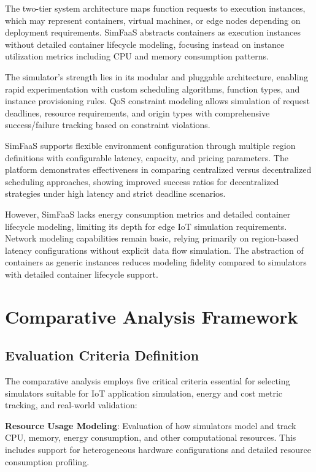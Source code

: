 The two-tier system architecture maps function requests to execution instances, which may represent containers, virtual machines, or edge nodes depending on deployment requirements. SimFaaS abstracts containers as execution instances without detailed container lifecycle modeling, focusing instead on instance utilization metrics including CPU and memory consumption patterns.

The simulator's strength lies in its modular and pluggable architecture, enabling rapid experimentation with custom scheduling algorithms, function types, and instance provisioning rules. QoS constraint modeling allows simulation of request deadlines, resource requirements, and origin types with comprehensive success/failure tracking based on constraint violations.

SimFaaS supports flexible environment configuration through multiple region definitions with configurable latency, capacity, and pricing parameters. The platform demonstrates effectiveness in comparing centralized versus decentralized scheduling approaches, showing improved success ratios for decentralized strategies under high latency and strict deadline scenarios.

However, SimFaaS lacks energy consumption metrics and detailed container lifecycle modeling, limiting its depth for edge IoT simulation requirements. Network modeling capabilities remain basic, relying primarily on region-based latency configurations without explicit data flow simulation. The abstraction of containers as generic instances reduces modeling fidelity compared to simulators with detailed container lifecycle support.

\section{Comparative Analysis Framework}

\subsection{Evaluation Criteria Definition}

The comparative analysis employs five critical criteria essential for selecting simulators suitable for IoT application simulation, energy and cost metric tracking, and real-world validation:

\textbf{Resource Usage Modeling}: Evaluation of how simulators model and track CPU, memory, energy consumption, and other computational resources. This includes support for heterogeneous hardware configurations and detailed resource consumption profiling.

